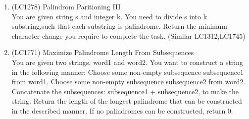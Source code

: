 \begin{exercise}
\begin{enumerate}
        \item (LC1278) Palindrom Paritioning III \\You are given string s and integer k. You need to divide s into k substring,such that each substring is palindrome. Return the minimum character change you require to complete the task. (Similar LC1312,LC1745)

        \item (LC1771) Maximize Palindrome Length From Subsequences\\ You are given two strings, word1 and word2. You want to construct a string in the following manner:
        Choose some non-empty subsequence subsequence1 from word1.
        Choose some non-empty subsequence subsequence2 from word2.
        Concatenate the subsequences: subsequence1 + subsequence2, to make the string.
        Return the length of the longest palindrome that can be constructed in the described manner. If no palindromes can be constructed, return 0.
       


    \end{enumerate}

\end{exercise}

